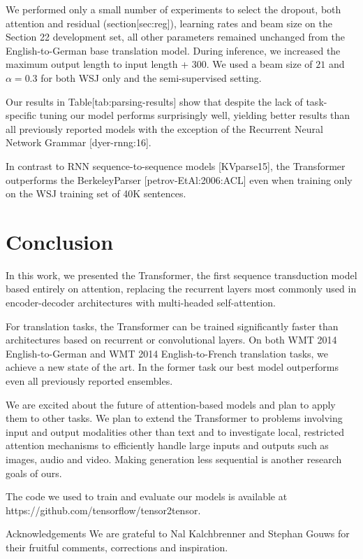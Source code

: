 \documentclass[11pt,a4paper]{article}
\begin{document}
We performed only a small number of experiments to select the dropout, both attention and residual (section[sec:reg]), learning rates and beam size on the Section 22 development set, all other parameters remained unchanged from the English-to-German base translation model. During inference, we increased the maximum output length to input length + $300$. We used a beam size of $21$ and $\alpha=0.3$ for both WSJ only and the semi-supervised setting.

Our results in Table[tab:parsing-results] show that despite the lack of task-specific tuning our model performs surprisingly well, yielding better results than all previously reported models with the exception of the Recurrent Neural Network Grammar [dyer-rnng:16].

In contrast to RNN sequence-to-sequence models [KVparse15], the Transformer outperforms the BerkeleyParser [petrov-EtAl:2006:ACL] even when training only on the WSJ training set of 40K sentences.

\section{Conclusion}

In this work, we presented the Transformer, the first sequence transduction model based entirely on attention, replacing the recurrent layers most commonly used in encoder-decoder architectures with multi-headed self-attention.

For translation tasks, the Transformer can be trained significantly faster than architectures based on recurrent or convolutional layers. On both WMT 2014 English-to-German and WMT 2014 English-to-French translation tasks, we achieve a new state of the art. In the former task our best model outperforms even all previously reported ensembles.

We are excited about the future of attention-based models and plan to apply them to other tasks. We plan to extend the Transformer to problems involving input and output modalities other than text and to investigate local, restricted attention mechanisms to efficiently handle large inputs and outputs such as images, audio and video.
Making generation less sequential is another research goals of ours.

The code we used to train and evaluate our models is available at https://github.com/tensorflow/tensor2tensor.

Acknowledgements We are grateful to Nal Kalchbrenner and Stephan Gouws for
their fruitful comments, corrections and inspiration.
\end{document}
